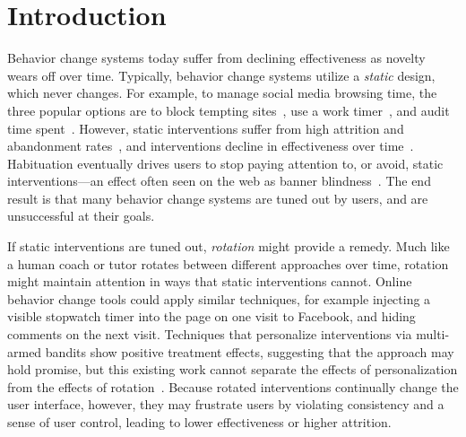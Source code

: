 
\section{Introduction}

Behavior change systems today suffer from declining effectiveness as novelty wears off over time. Typically, behavior change systems utilize a \textit{static} design, which never changes. For example, to manage social media browsing time, the three popular options are to block tempting sites~\cite{stayfocusd}, use a work timer~\cite{focusbooster}, and audit time spent~\cite{khovanskaya2013everybody,rescuetimeapp}. However, static interventions suffer from high attrition and abandonment rates~\cite{collins2014social,eysenbach2005law}, and interventions decline in effectiveness over time~\cite{krebs2010meta}. Habituation eventually drives users to stop paying attention to, or avoid, static interventions---an effect often seen on the web as banner blindness~\cite{benway1998banner}. The end result is that many behavior change systems are tuned out by users, and are unsuccessful at their goals.

If static interventions are tuned out, \textit{rotation} might provide a remedy. Much like a human coach or tutor rotates between different approaches over time, rotation might maintain attention in ways that static interventions cannot. Online behavior change tools could apply similar techniques, for example injecting a visible stopwatch timer into the page on one visit to Facebook, and hiding comments on the next visit.
Techniques that personalize interventions via multi-armed bandits show positive treatment effects, suggesting that the approach may hold promise, but this existing work cannot separate the effects of personalization from the effects of rotation~\cite{rabbi2015automated, lei2017actor, paredes2014poptherapy}. %
Because rotated interventions continually change the user interface, however, they may frustrate users by violating consistency and a sense of user control, leading to lower effectiveness or higher attrition. %


